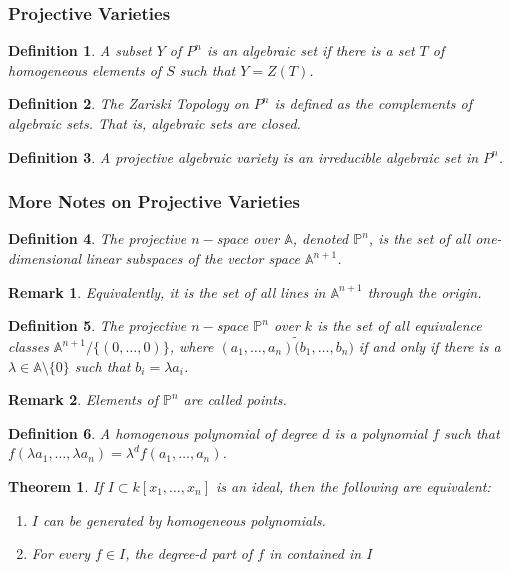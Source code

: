 \documentclass{article}
\theoremstyle{mystyle}
\newtheorem{theorem}{Theorem}[section]
\newtheorem{definition}{Definition}[section]
\newtheorem{remark}{Remark}[section]
\begin{document}
\subsubsection{Projective Varieties}
\begin{definition}
A subset $Y$ of $P^n$ is an algebraic set if there is a set $T$ of homogeneous elements of $S$ such that $Y=Z(T)$.
\end{definition}
\begin{definition}
The Zariski Topology on $P^n$ is defined as the complements of algebraic sets. That is, algebraic sets are closed.
\end{definition}
\begin{definition}
A projective algebraic variety is an irreducible algebraic set in $P^n$.
\end{definition}
\subsubsection{More Notes on Projective Varieties}
\begin{definition}
The projective $n-$space over $\mathbb{A}$, denoted $\mathbb{P}^n$, is the set of all one-dimensional linear subspaces of the vector space $\mathbb{A}^{n+1}$.
\end{definition}
\begin{remark}
Equivalently, it is the set of all lines in $\mathbb{A}^{n+1}$ through the origin.
\end{remark}
\begin{definition}
The projective $n-$space $\mathbb{P}^n$ over $k$ is the set of all equivalence classes $\mathbb{A}^{n+1}/\{(0,\hdots, 0)\}$, where $(a_1,\hdots, a_n)\tilde (b_1,\hdots, b_n)$ if and only if there is a $\lambda \in \mathbb{A}\setminus \{0\}$ such that $b_i = \lambda a_i$.
\end{definition}
\begin{remark}
Elements of $\mathbb{P}^n$ are called points.
\end{remark}
\begin{definition}
A homogenous polynomial of degree $d$ is a polynomial $f$ such that $f(\lambda a_1,\hdots, \lambda a_n) = \lambda^d f(a_1,\hdots, a_n)$.
\end{definition}
\begin{theorem}
If $I\subset k[x_1,\hdots ,x_n]$ is an ideal, then the following are equivalent:
\begin{enumerate}
    \item $I$ can be generated by homogeneous polynomials.
    \item For every $f\in I$, the degree-$d$ part of $f$ in contained in $I$
\end{enumerate}
\end{theorem}
\end{document}
